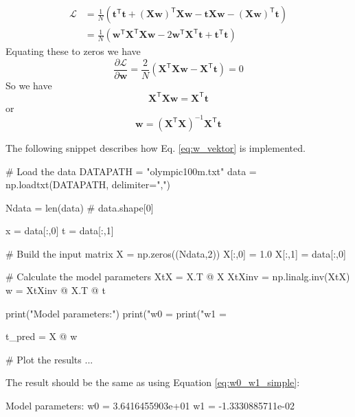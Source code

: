 \begin{align}
\mathcal{L} & = \frac{1}{N} \left(
\mathbf{t}^{\mathsf{T}} \mathbf{t} +
\left(\mathbf{Xw}\right)^{\mathsf{T}} \mathbf{Xw} -
\mathbf{t}\mathbf{Xw} -
\left(\mathbf{Xw}\right)^{\mathsf{T}} \mathbf{t}
\right) \\
& = \frac{1}{N} \left(
\mathbf{w}^{\mathsf{T}} \mathbf{X}^{\mathsf{T}} \mathbf{X} \mathbf{w} -
2 \mathbf{w}^{\mathsf{T}} \mathbf{X}^{\mathsf{T}}\mathbf{t} +
\mathbf{t}^{\mathsf{T}} \mathbf{t}
\right)
\end{align}
Equating these to zeros we have
\begin{equation}
\frac{\partial \mathcal{L}}{\partial \mathbf{w}} =
\frac{2}{N} \left( \mathbf{X}^{\mathsf{T}} \mathbf{Xw} - \mathbf{X}^{\mathsf{T}}\mathbf{t} \right) = 0
\end{equation}
So we have
\begin{equation}
\mathbf{X}^{\mathsf{T}} \mathbf{Xw} = \mathbf{X}^{\mathsf{T}} \mathbf{t}
\end{equation}
or
\begin{equation}
\mathbf{w} = \left(\mathbf{X}^{\mathsf{T}}\mathbf{X} \right)^{-1} \mathbf{X}^{\mathsf{T}} \mathbf{t}
\label{eq:w_vektor}
\end{equation}

The following snippet describes how Eq. \eqref{eq:w_vektor} is implemented.
\begin{pythoncode}
# Load the data
DATAPATH = "olympic100m.txt"
data = np.loadtxt(DATAPATH, delimiter=",")
  
Ndata = len(data) # data.shape[0]
  
x = data[:,0]
t = data[:,1]
  
# Build the input matrix
X = np.zeros((Ndata,2))
X[:,0] = 1.0
X[:,1] = data[:,0]
  
# Calculate the model parameters
XtX = X.T @ X
XtXinv = np.linalg.inv(XtX)
w = XtXinv @ X.T @ t
  
print("Model parameters:")
print("w0 = %
print("w1 = %
  
t_pred = X @ w

# Plot the results ...
\end{pythoncode}

The result should be the same as using Equation \eqref{eq:w0_w1_simple}:
\begin{textcode}
Model parameters:
w0 =   3.6416455903e+01
w1 =  -1.3330885711e-02  
\end{textcode}


